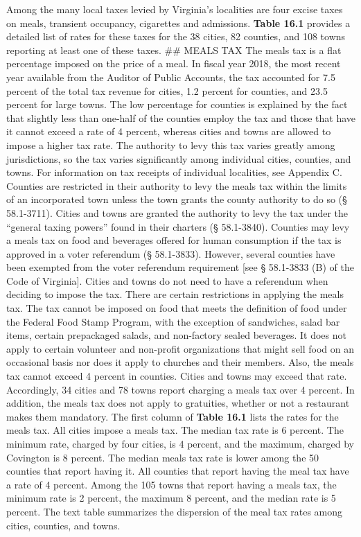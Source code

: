 \documentclass[
]{book}
\begin{document}
Among the many local taxes levied by Virginia's localities are four excise taxes on meals, transient occupancy, cigarettes and admissions. \textbf{Table 16.1} provides a detailed list of rates for these taxes for the 38 cities, 82 counties, and 108 towns reporting at least one of these taxes.
\textbar{}
\#\# MEALS TAX
\textbar{} The meals tax is a flat percentage imposed on the price of a meal. In fiscal year 2018, the most recent year available from the Auditor of Public Accounts, the tax accounted for 7.5 percent of the total tax revenue for cities, 1.2 percent for counties, and 23.5 percent for large towns. The low percentage for counties is explained by the fact that slightly less than one-half of the counties employ the tax and those that have it cannot exceed a rate of 4 percent, whereas cities and towns are allowed to impose a higher tax rate. The authority to levy this tax varies greatly among jurisdictions, so the tax varies significantly among individual cities, counties, and towns. For information on tax receipts of individual localities, see Appendix C.
\textbar{}
\textbar{} Counties are restricted in their authority to levy the meals tax within the limits of an incorporated town unless the town grants the county authority to do so (§ 58.1-3711). Cities and towns are granted the authority to levy the tax under the ``general taxing powers'' found in their charters (§ 58.1-3840).
\textbar{}
\textbar{} Counties may levy a meals tax on food and beverages offered for human consumption if the tax is approved in a voter referendum (§ 58.1-3833). However, several counties have been exempted from the voter referendum requirement {[}see § 58.1-3833 (B) of the Code of Virginia{]}. Cities and towns do not need to have a referendum when deciding to impose the tax.
\textbar{}
\textbar{} There are certain restrictions in applying the meals tax. The tax cannot be imposed on food that meets the definition of food under the Federal Food Stamp Program, with the exception of sandwiches, salad bar items, certain prepackaged salads, and non-factory sealed beverages. It does not apply to certain volunteer and non-profit organizations that might sell food on an occasional basis nor does it apply to churches and their members. Also, the meals tax cannot exceed 4 percent in counties. Cities and towns may exceed that rate. Accordingly, 34 cities and 78 towns report charging a meals tax over 4 percent. In addition, the meals tax does not apply to gratuities, whether or not a restaurant makes them mandatory.
\textbar{}
\textbar{} The first column of \textbf{Table 16.1} lists the rates for the meals tax. All cities impose a meals tax. The median tax rate is 6 percent. The minimum rate, charged by four cities, is 4 percent, and the maximum, charged by Covington is 8 percent. The median meals tax rate is lower among the 50 counties that report having it. All counties that report having the meal tax have a rate of 4 percent. Among the 105 towns that report having a meals tax, the minimum rate is 2 percent, the maximum 8 percent, and the median rate is 5 percent.
\textbar{}
\textbar{} The text table summarizes the dispersion of the meal tax rates among cities, counties, and towns.
\end{document}
